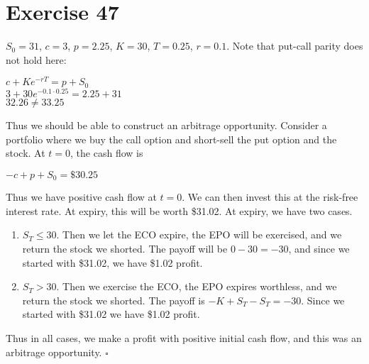 \documentclass{article}
\begin{document}
\section*{Exercise 47}
\begin{flushleft}
    $S_0 = 31$, $c = 3$, $p = 2.25$, $K = 30$, $T = 0.25$, $r=0.1$.
    Note that put-call parity does not hold here:
    \begin{center}
        $c + Ke^{-rT} = p + S_0$ \\
        $3 + 30e^{-0.1 \cdot 0.25} = 2.25 + 31$ \\
        $32.26 \neq 33.25$
    \end{center}
    Thus we should be able to construct an arbitrage opportunity. Consider a portfolio where
    we buy the call option and short-sell the put option and the stock. At $t=0$, the cash flow is
    \begin{center}
        $-c + p + S_0 = \$30.25$
    \end{center}
    Thus we have positive cash flow at $t=0$. We can then invest this at the risk-free interest rate. At expiry, this will be worth \$31.02. At expiry, we have two cases.
    \begin{enumerate}
        \item $S_T \leq 30$. Then we let the ECO expire, the EPO will be exercised, and we return the stock we shorted. The payoff will be $0 - 30 = -30$,
                and since we started with \$31.02, we have \$1.02 profit.
        \item $S_T > 30$. Then we exercise the ECO, the EPO expires worthless, and we return the stock we shorted. The payoff is $-K + S_T - S_T = -30$.
                Since we started with \$31.02 we have \$1.02 profit.
    \end{enumerate}
    Thus in all cases, we make a profit with positive initial cash flow, and this was an arbitrage opportunity. $\square$
\end{flushleft}
\end{document}
